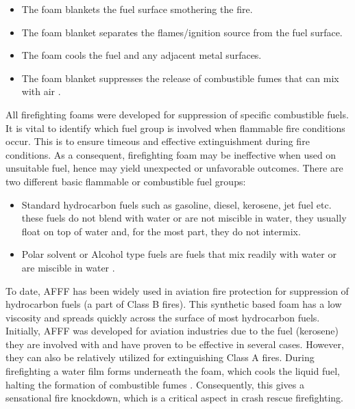 \begin{itemize}
    \item The foam blankets the fuel surface smothering the fire. 
    \item The foam blanket separates the flames/ignition source from the fuel surface. 
    \item The foam cools the fuel and any adjacent metal surfaces. 
    \item The foam blanket suppresses the release of combustible fumes that can mix with air \cite{beneventi2001role}. 
\end{itemize}

All firefighting foams were developed for suppression of specific combustible fuels. It is vital to identify which fuel group is involved when flammable fire conditions occur. This is to ensure timeous and effective extinguishment during fire conditions. As a consequent, firefighting foam may be ineffective when used on unsuitable fuel, hence may yield unexpected or unfavorable outcomes. There are two different basic flammable or combustible fuel groups:

\begin{itemize}
    \item Standard hydrocarbon fuels such as gasoline, diesel, kerosene, jet fuel etc. these fuels do not blend with water or are not miscible in water, they usually float on top of water and, for the most part, they do not intermix.
    \item Polar solvent or Alcohol type fuels are fuels that mix readily with water or are miscible in water \cite{beneventi2001role}.
\end{itemize}

To date, AFFF has been widely used in aviation fire protection for suppression of hydrocarbon fuels (a part of Class B fires). This synthetic based foam has a low viscosity and spreads quickly across the surface of most hydrocarbon fuels. Initially, AFFF was developed for aviation industries due to the fuel (kerosene) they are involved with and have proven to be effective in several cases. However, they can also be relatively utilized for extinguishing Class A fires. During firefighting a water film forms underneath the foam, which cools the liquid fuel, halting the formation of combustible fumes \cite{scheffey1995evaluating}. Consequently, this gives a sensational fire knockdown, which is a critical aspect in crash rescue firefighting.

